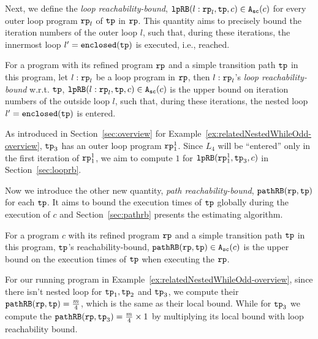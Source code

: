 Next, we define the \emph{loop reachability-bound},
$\mathtt{lpRB}(l: \mathtt{rp}_l, \mathtt{tp}, c) \in {\ensuremath{\mathtt{A_{sc}}}}(c)$ for every outer loop program $\mathtt{rp}_l$ of $\mathtt{tp}$ in $\mathtt{rp}$. This quantity aims to precisely bound the iteration numbers of the outer loop $l$,
such that,
during these iterations, the innermost loop $l' = \mathtt{enclosed(\mathtt{tp})}$ is executed, i.e., reached.
\begin{defn}
For a program with its refined program $\mathtt{rp}$ and a simple transition path $\mathtt{tp}$ in this program, 
let $l: \mathtt{rp}_l$ be a loop program in $\mathtt{rp}$,
then $l: \mathtt{rp}_l$'s \emph{loop reachability-bound} w.r.t. $\mathtt{tp}$,  $\mathtt{lpRB}(l: \mathtt{rp}_l, \mathtt{tp}, c) \in {\ensuremath{\mathtt{A_{sc}}}}(c)$
is the upper bound on iteration numbers of the outside loop $l$,
such that,
during these iterations, the nested loop $l' = \mathtt{enclosed(\mathtt{tp})}$ is entered.
\end{defn}
As introduced in Section~\ref{sec:overview} for Example~\ref{ex:relatedNestedWhileOdd-overview}, $\mathtt{tp}_3$ has an outer loop program $\mathtt{rp}_1^1$. Since $L_4$ will be ``entered'' only in the first iteration of $\mathtt{rp}_1^1$,
we aim to compute $1$ for $\mathtt{lpRB}(\mathtt{rp}_1^1, \mathtt{tp}_3, c)$ in Section~\ref{sec:looprb}.

Now we introduce the other new quantity, \emph{path reachability-bound}, $\mathtt{pathRB}(\mathtt{rp}, \mathtt{tp})$ for each $\mathtt{tp}$.
It aims to bound the execution times of $\mathtt{tp}$ globally during the execution of $c$ and Section~\ref{sec:pathrb} presents the estimating algorithm.
%
\begin{defn}
For a program $c$ with its refined program $\mathtt{rp}$ and a simple transition path $\mathtt{tp}$ in this program, 
$\mathtt{tp}$'s reachability-bound, $\mathtt{pathRB}(\mathtt{rp}, \mathtt{tp}) \in {\ensuremath{\mathtt{A_{sc}}}}(c)$ is the upper bound on the
execution times of $\mathtt{tp}$ when executing the $\mathtt{rp}$.
\end{defn}

For our running program in Example~\ref{ex:relatedNestedWhileOdd-overview}, since there isn't nested loop for $\mathtt{tp}_1, \mathtt{tp}_2$ and $\mathtt{tp}_3$, we compute their $\mathtt{pathRB}(\mathtt{rp}, \mathtt{tp}) = \frac{m}{4} $, which is the same as their local bound.
While for $\mathtt{tp}_3$ we compute  the $\mathtt{pathRB}(\mathtt{rp}, \mathtt{tp}_3) = \frac{m}{4} \times 1$ by multiplying its local bound with loop reachability bound.

